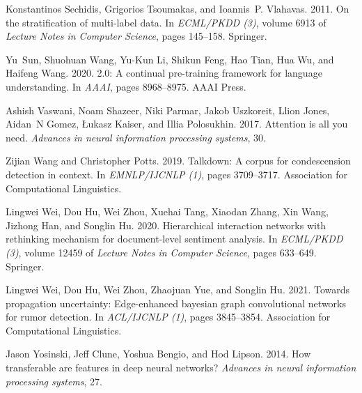 \documentclass[11pt]{article}
\begin{document}
\begin{thebibliography}{31}
    Konstantinos Sechidis, Grigorios Tsoumakas, and Ioannis~P. Vlahavas. 2011.
    \newblock On the stratification of multi-label data.
    \newblock In \emph{{ECML/PKDD} {(3)}}, volume 6913 of \emph{Lecture Notes in
      Computer Science}, pages 145--158. Springer.
    
    Yu~Sun, Shuohuan Wang, Yu{-}Kun Li, Shikun Feng, Hao Tian, Hua Wu, and Haifeng
      Wang. 2020.
     2.0: {A} continual pre-training framework for language
      understanding.
    \newblock In \emph{{AAAI}}, pages 8968--8975. {AAAI} Press.
    
    Ashish Vaswani, Noam Shazeer, Niki Parmar, Jakob Uszkoreit, Llion Jones,
      Aidan~N Gomez, {\L}ukasz Kaiser, and Illia Polosukhin. 2017.
    \newblock Attention is all you need.
    \newblock \emph{Advances in neural information processing systems}, 30.
    
    Zijian Wang and Christopher Potts. 2019.
    \newblock Talkdown: {A} corpus for condescension detection in context.
    \newblock In \emph{{EMNLP/IJCNLP} {(1)}}, pages 3709--3717. Association for
      Computational Linguistics.
    
    Lingwei Wei, Dou Hu, Wei Zhou, Xuehai Tang, Xiaodan Zhang, Xin Wang, Jizhong
      Han, and Songlin Hu. 2020.
    \newblock Hierarchical interaction networks with rethinking mechanism for
      document-level sentiment analysis.
    \newblock In \emph{{ECML/PKDD} {(3)}}, volume 12459 of \emph{Lecture Notes in
      Computer Science}, pages 633--649. Springer.
    
    Lingwei Wei, Dou Hu, Wei Zhou, Zhaojuan Yue, and Songlin Hu. 2021.
    \newblock Towards propagation uncertainty: Edge-enhanced bayesian graph
      convolutional networks for rumor detection.
    \newblock In \emph{{ACL/IJCNLP} {(1)}}, pages 3845--3854. Association for
      Computational Linguistics.
    
    Jason Yosinski, Jeff Clune, Yoshua Bengio, and Hod Lipson. 2014.
    \newblock How transferable are features in deep neural networks?
    \newblock \emph{Advances in neural information processing systems}, 27.
    

\end{thebibliography}
\end{document}
